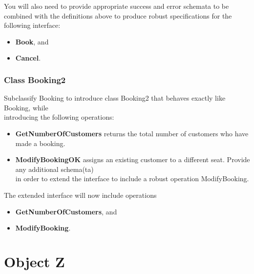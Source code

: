 \documentclass[12pt]{article}
\begin{document}
\noindent You will also need to provide appropriate success and error schemata to be combined with
the definitions above to produce robust specifications for the following interface:
\begin{itemize}
	\item\textbf{Book}, and
	\item \textbf{Cancel}.
\end{itemize}

\subsubsection{Class Booking2}
\noindent Subclassify Booking to introduce class Booking2 that behaves exactly like Booking, while\\
introducing the following operations:

\begin{itemize}
	\item \textbf{GetNumberOfCustomers} returns the total number of customers who have made a booking.
	\item \textbf{ModifyBookingOK} assigns an existing customer to a different seat. Provide any additional schema(ta) \\
in order to extend the interface to include a robust operation ModifyBooking.
\end{itemize}

\noindent The extended interface will now include operations
\begin{itemize}
	\item \textbf{GetNumberOfCustomers}, and
	\item \textbf{ModifyBooking}.
\end{itemize}

\newpage

\section{Object Z}
\end{document}
